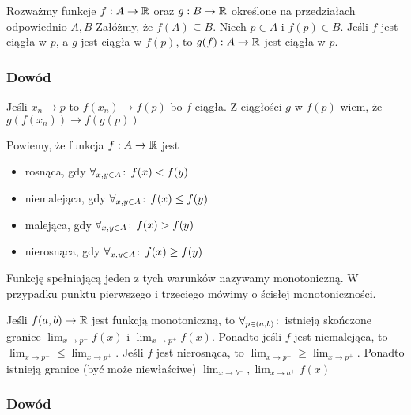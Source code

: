 \documentclass[9pt]{article}
\begin{document}
\begin{Twi}
    Rozważmy funkcje $f:A \to \mathbb{R}$ oraz $g: B \to \mathbb{R}$ określone na przedziałach odpowiednio $A, B$
    Załóżmy, że $f(A) \subseteq B$. Niech $p \in A$ i $f(p) \in B$. Jeśli $f$ jest ciągła w $p$, a
    $g$ jest ciągła w $f(p)$, to $g(f): A \to \mathbb{R}$ jest ciągła w $p$.
\end{Twi}

\subsubsection*{Dowód}

Jeśli $x_n \to p$ to $f(x_n) \to f(p)$ bo $f$ ciągła. Z ciągłości $g$ w $f(p)$ wiem, że $g(f(x_n))
\to f(g(p))$

\begin{Def}
    Powiemy, że funkcja $f: A \to \mathbb{R}$ jest
    \begin{itemize}
        \item rosnąca, gdy $\forall_{x, y \in A} \! : \, f(x) < f(y)$
        \item niemalejąca, gdy $\forall_{x, y \in A} \! : \, f(x) \le f(y)$
        \item malejąca, gdy $\forall_{x, y \in A} \! : \, f(x) > f(y)$
        \item nierosnąca, gdy $\forall_{x, y \in A} \! : \, f(x) \ge f(y)$
    \end{itemize}
\end{Def}

Funkcję spełniającą jeden z tych warunków nazywamy monotoniczną. W przypadku punktu pierwszego i
trzeciego mówimy o ścisłej monotoniczności.

\begin{Twi}
    Jeśli $f(a,b) \to \mathbb{R}$ jest funkcją monotoniczną, to $\forall_{p \in (a,b)} \! : \,$ istnieją skończone
    granice $\lim_{x \to p^-} f(x)$ i $\lim_{x \to p^+} f(x)$. Ponadto jeśli $f$ jest niemalejąca,
    to $\lim_{x \to p^-} \le \lim_{x \to p^+}$. Jeśli $f$ jest nierosnąca, to $\lim_{x \to p^-} \ge
    \lim_{x \to p^+}$. Ponadto istnieją granice (być może niewłaściwe) $\lim_{x \to b^-}, \lim_{x
    \to a^+}f(x)$
\end{Twi}

\subsubsection*{Dowód}
\end{document}
